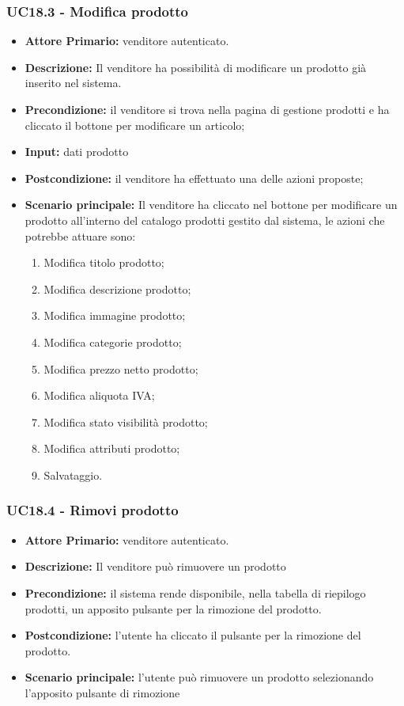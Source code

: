 \subsubsection{UC18.3 - Modifica  prodotto}
\begin{itemize}
    \item \textbf{Attore Primario:}  venditore autenticato.
    \item \textbf{Descrizione:} Il venditore ha possibilità di modificare un prodotto già inserito nel sistema.
    \item \textbf{Precondizione:} il venditore  si trova nella pagina di gestione prodotti e ha cliccato il bottone per modificare un articolo;
    \item \textbf{Input:} dati prodotto
    \item \textbf{Postcondizione:} il venditore ha effettuato una delle azioni proposte;
    \item \textbf{Scenario principale:} Il venditore ha cliccato nel bottone per modificare un prodotto all’interno del catalogo prodotti gestito dal sistema, le azioni che potrebbe attuare sono: 
    \begin{enumerate}
        \item Modifica titolo prodotto;
        \item Modifica descrizione prodotto;
        \item Modifica immagine prodotto;
        \item Modifica categorie prodotto;
        \item Modifica prezzo netto prodotto;
        \item Modifica aliquota IVA;
        \item Modifica stato visibilità prodotto; 
        \item Modifica attributi prodotto;
        \item Salvataggio.
    \end{enumerate}
\end{itemize}

\subsubsection{UC18.4 - Rimovi  prodotto}
\begin{itemize}
    \item \textbf{Attore Primario:}  venditore autenticato.
    \item \textbf{Descrizione:} Il venditore può rimuovere un prodotto
    \item \textbf{Precondizione:} il sistema rende disponibile, nella tabella di riepilogo prodotti, un apposito pulsante per la rimozione del prodotto.
    \item \textbf{Postcondizione:} l’utente ha cliccato il pulsante per la rimozione del prodotto. 
    \item \textbf{Scenario principale:} l’utente può rimuovere un prodotto selezionando l’apposito pulsante di rimozione
   
\end{itemize}


